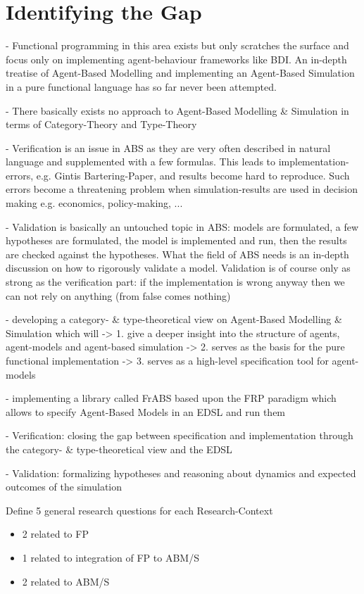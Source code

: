 \section{Identifying the Gap}
- Functional programming in this area exists but only scratches the surface and focus only on implementing agent-behaviour frameworks like BDI. An in-depth treatise of Agent-Based Modelling and implementing an Agent-Based Simulation in a pure functional language has so far never been attempted.

- There basically exists no approach to Agent-Based Modelling \& Simulation in terms of Category-Theory and Type-Theory

- Verification is an issue in ABS as they are very often described in natural language and supplemented with a few formulas. This leads to implementation-errors, e.g. Gintis Bartering-Paper, and results become hard to reproduce. Such errors become a threatening problem when simulation-results are used in decision making e.g. economics, policy-making, ...

- Validation is basically an untouched topic in ABS: models are formulated, a few hypotheses are formulated, the model is implemented and run, then the results are checked against the hypotheses. What the field of ABS needs is an in-depth discussion on how to rigorously validate a model. Validation is of course only as strong as the verification part: if the implementation is wrong anyway then we can not rely on anything (from false comes nothing)


- developing a category- \& type-theoretical view on Agent-Based Modelling \& Simulation which will 
	-> 1. give a deeper insight into the structure of agents, agent-models and agent-based simulation
	-> 2. serves as the basis for the pure functional implementation
	-> 3. serves as a high-level specification tool for agent-models

- implementing a library called FrABS based upon the FRP paradigm which allows to specify Agent-Based Models in an EDSL and run them

- Verification: closing the gap between specification and implementation through the category- \& type-theoretical view and the EDSL

- Validation: formalizing hypotheses and reasoning about dynamics and expected outcomes of the simulation

Define 5 general research questions for each Research-Context
	\begin{itemize}
    \item 2 related to FP
    \item 1 related to integration of FP to ABM/S
    \item 2 related to ABM/S
    \end{itemize}
    
